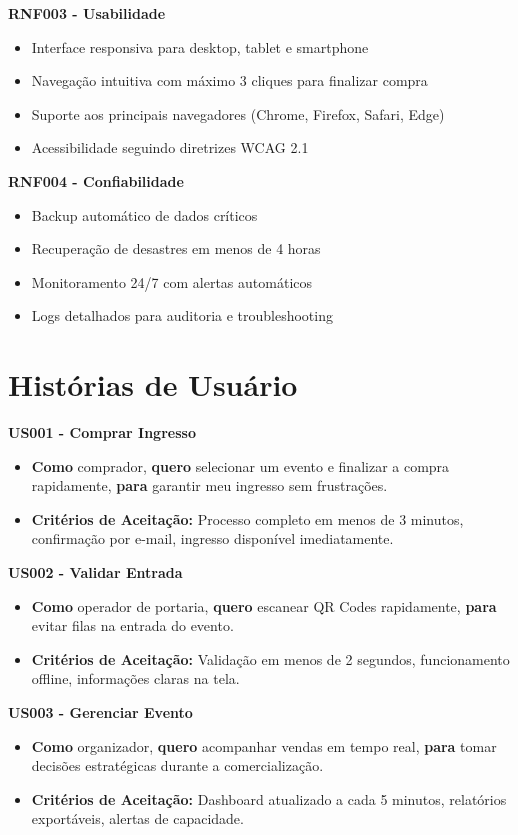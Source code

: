\textbf{RNF003 - Usabilidade}
\begin{itemize}
    \item Interface responsiva para desktop, tablet e smartphone
    \item Navegação intuitiva com máximo 3 cliques para finalizar compra
    \item Suporte aos principais navegadores (Chrome, Firefox, Safari, Edge)
    \item Acessibilidade seguindo diretrizes WCAG 2.1~\cite{WCAG:2018}
\end{itemize}

\textbf{RNF004 - Confiabilidade}
\begin{itemize}
    \item Backup automático de dados críticos
    \item Recuperação de desastres em menos de 4 horas
    \item Monitoramento 24/7 com alertas automáticos
    \item Logs detalhados para auditoria e troubleshooting
\end{itemize}

\section{Histórias de Usuário}

\textbf{US001 - Comprar Ingresso}
\begin{itemize}
    \item \textbf{Como} comprador, \textbf{quero} selecionar um evento e finalizar a compra rapidamente, \textbf{para} garantir meu ingresso sem frustrações.
    \item \textbf{Critérios de Aceitação:} Processo completo em menos de 3 minutos, confirmação por e-mail, ingresso disponível imediatamente.
\end{itemize}

\textbf{US002 - Validar Entrada}
\begin{itemize}
    \item \textbf{Como} operador de portaria, \textbf{quero} escanear QR Codes rapidamente, \textbf{para} evitar filas na entrada do evento.
    \item \textbf{Critérios de Aceitação:} Validação em menos de 2 segundos, funcionamento offline, informações claras na tela.
\end{itemize}

\textbf{US003 - Gerenciar Evento}
\begin{itemize}
    \item \textbf{Como} organizador, \textbf{quero} acompanhar vendas em tempo real, \textbf{para} tomar decisões estratégicas durante a comercialização.
    \item \textbf{Critérios de Aceitação:} Dashboard atualizado a cada 5 minutos, relatórios exportáveis, alertas de capacidade.
\end{itemize}

